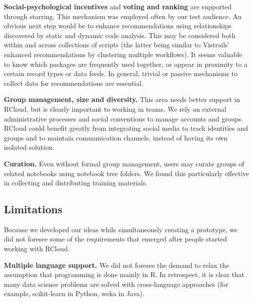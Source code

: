 {\bf Social-psychological incentives} and {\bf voting and ranking} are supported
through starring. This mechanism was employed often by our test
audience.  An obvious next step would be to enhance recommendations using
relationships discovered by static and dynamic code analysis. This may be
considered both within and across collections of scripts (the latter being
similar to Vistrails' enhanced recommendations by clustering multiple
workflows).  It seems valuable to know which packages are frequently used
together, or appear in proximity to a certain record types or data feeds.  In
general, trivial or passive mechanisms to collect data for recommendations are
essential.

{\bf Group management, size and diversity.} This area needs better
support in RCloud, but is clearly important to working in teams.
We rely on external administrative processes and social conventions
to manage accounts and groups. RCloud could benefit greatly from
integrating social media to track identities and groups and to maintain
communication channels, instead of having its own isolated solution.

{\bf Curation.} Even without formal group management, users may
curate groups of related notebooks using notebook tree folders.
We found this particularly effective in collecting and distributing
training materials.

\subsection{Limitations}
Because we developed our ideas while simultaneously creating a prototype,
we did not foresee some of the requirements that emerged after
people started working with RCloud.

{\bf Multiple language support.}
We did not foresee the demand to relax the assumption that programming
is done mainly in R. In retrospect, it is clear that many data science
problems are solved with cross-language approaches (for example, scikit-learn
in Python, weka in Java).

